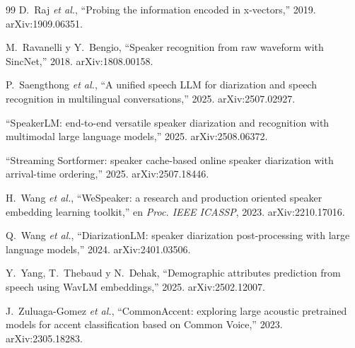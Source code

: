 \documentclass[11pt,a4paper]{article}
\begin{document}
\begin{thebibliography}{99}
 D.~Raj \emph{et al.}, ``Probing the information encoded in x-vectors,'' 2019. arXiv:1909.06351.

 M.~Ravanelli y Y.~Bengio, ``Speaker recognition from raw waveform with SincNet,'' 2018. arXiv:1808.00158.

 P.~Saengthong \emph{et al.}, ``A unified speech LLM for diarization and speech recognition in multilingual conversations,'' 2025. arXiv:2507.02927.

 ``SpeakerLM: end-to-end versatile speaker diarization and recognition with multimodal large language models,'' 2025. arXiv:2508.06372.

 ``Streaming Sortformer: speaker cache-based online speaker diarization with arrival-time ordering,'' 2025. arXiv:2507.18446.

 H.~Wang \emph{et al.}, ``WeSpeaker: a research and production oriented speaker embedding learning toolkit,'' en \emph{Proc. IEEE ICASSP}, 2023. arXiv:2210.17016.

 Q.~Wang \emph{et al.}, ``DiarizationLM: speaker diarization post-processing with large language models,'' 2024. arXiv:2401.03506.

 Y.~Yang, T.~Thebaud y N.~Dehak, ``Demographic attributes prediction from speech using WavLM embeddings,'' 2025. arXiv:2502.12007.

 J.~Zuluaga-Gomez \emph{et al.}, ``CommonAccent: exploring large acoustic pretrained models for accent classification based on Common Voice,'' 2023. arXiv:2305.18283.

\end{thebibliography}
\end{document}
